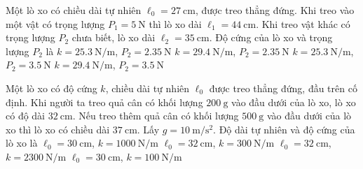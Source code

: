 \begin{ex}
Một lò xo có chiều dài tự nhiên $\ell_0=\SI{27}{\centi\meter}$, được treo thẳng đứng. Khi treo vào một vật có trọng lượng $P_1=\SI{5}{\newton}$ thì lò xo dài $\ell_1=\SI{44}{\centi\meter}$. Khi treo vật khác có trọng lượng $P_2$ chưa biết, lò xo dài $\ell_2=\SI{35}{\centi\meter}$. Độ cứng của lò xo và trọng lượng $P_2$ là	
	\choice
	{$k=\SI{25.3}{\newton/\meter}$, $P_2=\SI{2.35}{\newton}$}
	{\True $k=\SI{29.4}{\newton/\meter}$, $P_2=\SI{2.35}{\newton}$}
	{$k=\SI{25.3}{\newton/\meter}$, $P_2=\SI{3.5}{\newton}$}
	{$k=\SI{29.4}{\newton/\meter}$, $P_2=\SI{3.5}{\newton}$}
\end{ex}
\begin{ex}
	Một lò xo có độ cứng $k$, chiều dài tự nhiên $\ell_0$ được treo thẳng đứng, đầu trên cố định. Khi người ta treo quả cân có khối lượng $\SI{200}{\gram}$ vào đầu dưới của lò xo, lò xo có độ dài $\SI{32}{\centi\meter}$. Nếu treo thêm quả cân có khối lượng $\SI{500}{\gram}$ vào đầu dưới của lò xo thì lò xo có chiều dài $\SI{37}{\centi\meter}$. Lấy $g=\SI{10}{\meter/\second^2}$. Độ dài tự nhiên và độ cứng của lò xo là
	\choice
	{$\ell_0=\SI{30}{\centi\meter}$, $k=\SI{1000}{\newton/\meter}$}
	{$\ell_0=\SI{32}{\centi\meter}$, $k=\SI{300}{\newton/\meter}$}
	{$\ell_0=\SI{32}{\centi\meter}$, $k=\SI{2300}{\newton/\meter}$}
	{\True $\ell_0=\SI{30}{\centi\meter}$, $k=\SI{100}{\newton/\meter}$}
\end{ex}
